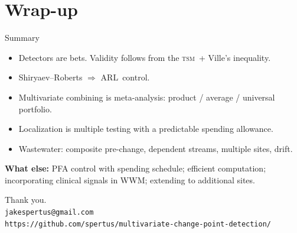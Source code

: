 \documentclass[10pt,aspectratio=169]{beamer}
\newcommand{\TSM}{\textsc{tsm}}
\newcommand{\ARL}{\ensuremath{\mathrm{ARL}}}
\begin{document}

\section{Wrap-up}

\begin{frame}{Summary}
  \begin{itemize}\setlength\itemsep{0.4em}
    \item Detectors are bets. Validity follows from the \TSM\ + Ville's inequality.
    \item Shiryaev--Roberts $\Rightarrow$ \ARL\ control.
    \item Multivariate combining is meta-analysis: product / average / universal portfolio.
    \item Localization is multiple testing with a predictable spending allowance.
    \item Wastewater: composite pre-change, dependent streams,
      multiple sites, drift.
  \end{itemize}
  \medskip

  \textbf{What else:}
  PFA control with spending schedule; efficient computation; incorporating clinical signals in WWM; extending to additional sites.
\end{frame}

\begin{frame}[standout]
  Thank you.\\[0.6em]
  {\normalsize \texttt{jakespertus@gmail.com}} \\
  {\normalsize \texttt{https://github.com/spertus/multivariate-change-point-detection/}}
\end{frame}
\end{document}
